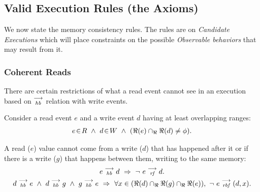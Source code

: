 
    \subsection{Valid Execution Rules (the Axioms)}
        We now state the memory consistency rules. The rules are on \textit{Candidate Executions} which will place constraints on the possible \textit{Observable behaviors} that may result from it.
         
        \subsubsection{Coherent Reads} 
        
            There are certain restrictions of what a read event cannot see in an execution based on $\stackrel{\longrightarrow}{_\textit{hb}}$ relation with write events.
            
            Consider a read event $e$ and a write event $d$ having at least overlapping ranges:
            \begin{align*}
                \event{e}{R} \ \wedge \ 
                \event{d}{W} \ \wedge \
                (\Re(e) \cap_\Re \Re(d) \neq \phi).
            \end{align*}
            
            A read ($e$) value cannot come from a write ($d$) that has happened after it or if there is a write ($g$) that happens between them, writing to the same memory:     
                \begin{gather*}
                    \reln{e}{hb}{d}\ \Rightarrow{}\ \neg \ \reln{e}{rf}{d}. \\
                    \reln{d}{hb}{e}
                    \ \wedge \ 
                    \reln{d}{hb}{g} \ \wedge \  \reln{g}{hb}{e}
                    \ \Rightarrow{} \
                    \forall x \in (\Re(d) \cap_\Re \Re(g) \cap_\Re \Re(e)), \ \neg \ \reln{e}{rbf}{(d,x)}.
                \end{gather*}
     
